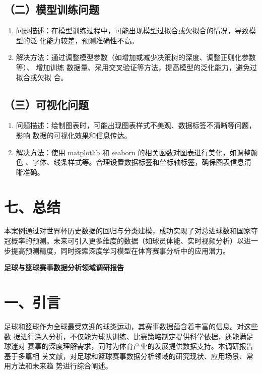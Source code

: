 \documentclass[UTF8]{ctexart}
\begin{document}
	\subsection*{（二）模型训练问题}
	\begin{enumerate}
		\item 问题描述：在模型训练过程中，可能出现模型过拟合或欠拟合的情况，导致模型的泛
		化能力较差，预测准确性不高。
		\item 解决方法：通过调整模型参数（如增加或减少决策树的深度、调整正则化参数等）、
		增加训练 数据量、采用交叉验证等方法，提高模型的泛化能力，避免过拟合或欠拟
		合。
	\end{enumerate}
	
	\subsection*{（三）可视化问题}
	\begin{enumerate}
		\item 问题描述：绘制图表时，可能出现图表样式不美观、数据标签不清晰等问题，影响
		数据的可视化效果和信息传达。
		\item 解决方法：使用 matplotlib 和 seaborn 的相关函数对图表进行美化，如调整颜色
		、字体、线条样式等。合理设置数据标签和坐标轴标签，确保图表信息清晰准确。
	\end{enumerate}
	
	\section*{七、总结}
	本案例通过对世界杯历史数据的回归与分类建模，成功实现了对总进球数和国家夺
	冠概率的预测。未来可引入更多维度的数据（如球员体能、实时视频分析）以进一
	步提高预测精度，同时探索深度学习模型在体育赛事分析中的应用潜力。
	
	\newpage
	
	\begin{center}
		 \bfseries 足球与篮球赛事数据分析领域调研报告 \\
	\end{center}
	
	\vspace{12pt}
	
	\section*{一、引言}
	足球和篮球作为全球最受欢迎的球类运动，其赛事数据蕴含着丰富的信息。对这些数
	据进行深入分析，不仅能为球队训练、比赛策略制定提供科学依据，还能满足球迷对
	赛事的深度理解需求，同时为体育产业的发展提供数据支持。本调研报告基于多篇相
	关文献，对足球和篮球赛事数据分析领域的研究现状、应用场景、常用方法和未来趋
	势进行综合阐述。
	
\end{document}
